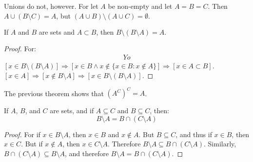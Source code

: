         Unions do not, however. For let $A$ be non-empty
        and let $A=B=C$. Then $A\cup(B\setminus{C})=A$, but
        $(A\cup{B})\setminus(A\cup{C})=\emptyset$.
        \begin{theorem}
            If $A$ and $B$ are sets and $A\subset B$,
            then $B\setminus(B\setminus A)=A$.
        \end{theorem}
        \begin{proof}
            For:
            \begin{align}
                Yo
            \end{align}
            $[x\in B\setminus(B\setminus{A})]%
            \Rightarrow[x\in{B}\land{x}\notin%
            \{x\in{B}:x\notin{A}\}]%
            \Rightarrow[x\in{A}\subset{B}]$.
            $[x\in{A}]\Rightarrow[x\notin{B}\setminus{A}]%
            \Rightarrow[x\in{B}\setminus(B\setminus{A})]$.
        \end{proof}
        The previous theorem shows that $(A^C)^{C}=A$.
        \begin{theorem}
            \label{thm:MEASURE_THEORY_SET_DIFFERENCE_AS_INTERSECTION}
            If $A$, $B$, and $C$ are sets, and if $A\subseteq{C}$
            and $B\subseteq{C}$, then:
            \begin{equation}
                B\setminus{A}=B\cap(C\setminus{A})
            \end{equation}
        \end{theorem}
        \begin{proof}
            For if $x\in{B}\setminus{A}$, then
            $x\in{B}$ and $x\notin{A}$. But
            $B\subseteq{C}$, and thus if $x\in{B}$, then $x\in{C}$.
            But if $x\notin{A}$, then $x\in{C}\setminus{A}$. Therefore
            $B\setminus{A}\subseteq{B}\cap(C\setminus{A})$.
            Similarly, $B\cap(C\setminus{A})\subseteq{B}\setminus{A}$,
            and therefore $B\setminus{A}={B}\cap(C\setminus{A})$.
        \end{proof}
